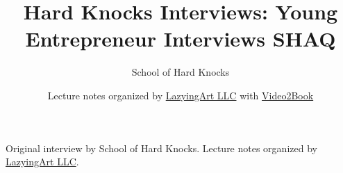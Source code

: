 \documentclass[11pt,oneside]{book}
\begin{document}
\frontmatter
\title{Hard Knocks Interviews: Young Entrepreneur Interviews SHAQ}
\author{School of Hard Knocks}
\date{Lecture notes organized by \href{https://lazying.art}{LazyingArt LLC} with \href{https://github.com/lachlanchen/Video2Book}{Video2Book}}
\maketitle
\begin{center}
\small Original interview by School of Hard Knocks. Lecture notes organized by \href{https://lazying.art}{LazyingArt LLC}.
\end{center}
\clearpage
\mainmatter

\end{document}
